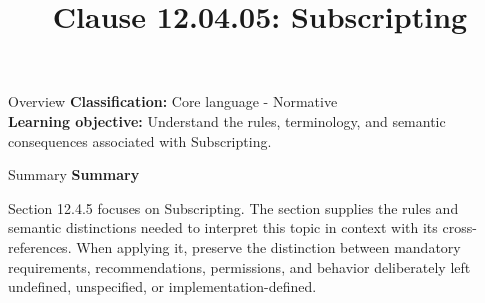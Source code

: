 \documentclass[10pt,letterpaper]{article}
\title{Clause 12.04.05: Subscripting}
\author{}
\date{}
\begin{document}
\maketitle
\begin{CornellOverviewBox}{Overview}
\textbf{Classification:} Core language - Normative\\[2pt]
\textbf{Learning objective:} Understand the rules, terminology, and semantic consequences associated with Subscripting.
\end{CornellOverviewBox}\begin{CornellSummaryBox}{Summary}
{\sffamily\bfseries\color{Accent} Summary}\par\vspace{3pt}Section 12.4.5 focuses on Subscripting. The section supplies the rules and semantic distinctions needed to interpret this topic in context with its cross-references. When applying it, preserve the distinction between mandatory requirements, recommendations, permissions, and behavior deliberately left undefined, unspecified, or implementation-defined.
\end{CornellSummaryBox}
\end{document}
